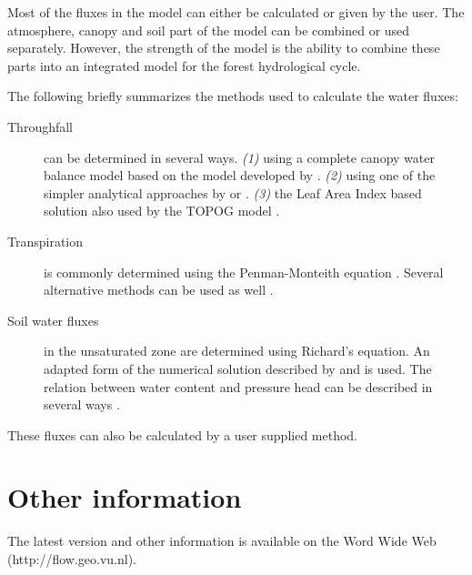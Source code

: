 \documentclass[11pt]{book}
\newcommand{\Index}[1]{#1\index{#1}}
\newcommand{\url}[1]{#1}
\begin{document}
Most of the fluxes in the model can either be calculated or given by
the user. The atmosphere, canopy and soil part of the model can be
combined or used separately. However, the strength of the model is the
ability to combine  these parts into an integrated model for the forest
hydrological cycle.

The following briefly summarizes the methods used to
calculate the water fluxes:
\begin{description}
\item[Throughfall] can be determined in several ways. {\em (1)} using 
a complete canopy water balance model based on the model developed by
 . {\em (2)} using one of the simpler 
analytical approaches by   or
 .  {\em (3)} the Leaf Area Index based
solution also used by the TOPOG model \cite{vertessy1993140}.

\item[Transpiration] is commonly determined using the Penman-Monteith
equation \cite{monteith1965}. Several alternative methods can be used 
as well \cite{penman1956N,makkink1957,makkink1961,commissie1988N}.

\item[Soil water fluxes] in the unsaturated zone are determined using
Richard's equation. An adapted form of the numerical solution described
by    and   is used.
The relation between water content and pressure head can be
described in several ways 
\cite{genuchten1980179,mualem1976261,clapp1978263}.

\end{description}
These fluxes can also be calculated by a user supplied method.

\section*{Other information}

The latest version and other information is  available on the
\Index{Word Wide Web}
(\url{http://flow.geo.vu.nl}). 






\printindex
\end{document}
